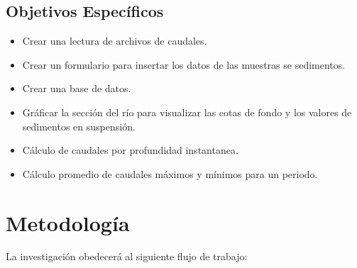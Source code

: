 \documentclass[12pt,a4paper]{report}
\begin{document}
	\subsection{Objetivos Específicos}
	\begin{itemize}
	\item Crear una lectura de archivos de caudales.
	\item Crear un formulario para insertar los datos de las muestras se sedimentos.
	\item Crear una base de datos.
	\item Gráficar la sección del río para visualizar las cotas de fondo y los valores de sedimentos en suspensión.
	\item Cálculo de caudales por profundidad instantanea.
	\item Cálculo promedio de caudales máximos y mínimos para un periodo.
	\end{itemize}
\section{Metodología}

La investigación obedecerá al siguiente flujo de trabajo:
\end{document}
